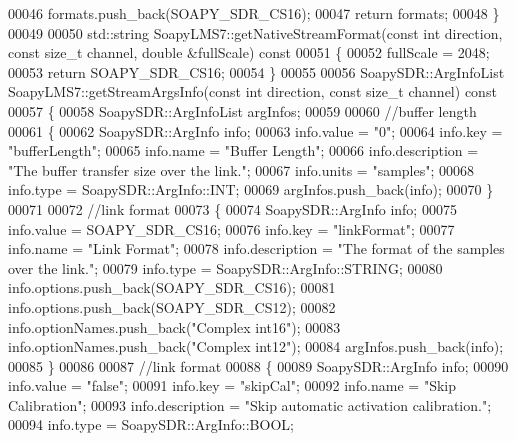 \begin{DoxyCode}
00046     formats.push\_back(SOAPY\_SDR\_CS16);
00047     \textcolor{keywordflow}{return} formats;
00048 \}
00049 
00050 std::string SoapyLMS7::getNativeStreamFormat(\textcolor{keyword}{const} \textcolor{keywordtype}{int} direction, \textcolor{keyword}{const} \textcolor{keywordtype}{size\_t} channel, \textcolor{keywordtype}{double} &fullScale)\textcolor{keyword}{
       const}
00051 \textcolor{keyword}{}\{
00052     fullScale = 2048;
00053     \textcolor{keywordflow}{return} SOAPY\_SDR\_CS16;
00054 \}
00055 
00056 SoapySDR::ArgInfoList SoapyLMS7::getStreamArgsInfo(\textcolor{keyword}{const} \textcolor{keywordtype}{int} direction, \textcolor{keyword}{const} \textcolor{keywordtype}{size\_t} channel)\textcolor{keyword}{ const}
00057 \textcolor{keyword}{}\{
00058     SoapySDR::ArgInfoList argInfos;
00059 
00060     \textcolor{comment}{//buffer length}
00061     \{
00062         SoapySDR::ArgInfo info;
00063         info.value = \textcolor{stringliteral}{"0"};
00064         info.key = \textcolor{stringliteral}{"bufferLength"};
00065         info.name = \textcolor{stringliteral}{"Buffer Length"};
00066         info.description = \textcolor{stringliteral}{"The buffer transfer size over the link."};
00067         info.units = \textcolor{stringliteral}{"samples"};
00068         info.type = SoapySDR::ArgInfo::INT;
00069         argInfos.push\_back(info);
00070     \}
00071 
00072     \textcolor{comment}{//link format}
00073     \{
00074         SoapySDR::ArgInfo info;
00075         info.value = SOAPY\_SDR\_CS16;
00076         info.key = \textcolor{stringliteral}{"linkFormat"};
00077         info.name = \textcolor{stringliteral}{"Link Format"};
00078         info.description = \textcolor{stringliteral}{"The format of the samples over the link."};
00079         info.type = SoapySDR::ArgInfo::STRING;
00080         info.options.push\_back(SOAPY\_SDR\_CS16);
00081         info.options.push\_back(SOAPY\_SDR\_CS12);
00082         info.optionNames.push\_back(\textcolor{stringliteral}{"Complex int16"});
00083         info.optionNames.push\_back(\textcolor{stringliteral}{"Complex int12"});
00084         argInfos.push\_back(info);
00085     \}
00086 
00087     \textcolor{comment}{//link format}
00088     \{
00089         SoapySDR::ArgInfo info;
00090         info.value = \textcolor{stringliteral}{"false"};
00091         info.key = \textcolor{stringliteral}{"skipCal"};
00092         info.name = \textcolor{stringliteral}{"Skip Calibration"};
00093         info.description = \textcolor{stringliteral}{"Skip automatic activation calibration."};
00094         info.type = SoapySDR::ArgInfo::BOOL;

\end{DoxyCode}
